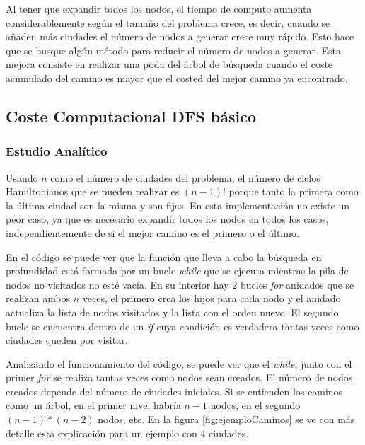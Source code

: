 \documentclass{uc3mpracticas}
\begin{document}
  Al tener que expandir todos los nodos, el tiempo de computo aumenta considerablemente según el tamaño del problema crece, es decir, cuando se añaden más ciudades el número de nodos a generar crece muy rápido. Esto hace que se busque algún método para reducir el número de nodos a generar. Esta mejora consiste en realizar una poda del árbol de búsqueda cuando el coste acumulado del camino es mayor que el costed del mejor camino ya encontrado.



  \subsection{Coste Computacional DFS básico}

  \subsubsection{Estudio Analítico}

  Usando $n$ como el número de ciudades del problema, el número de ciclos Hamiltonianos que se pueden realizar es $(n-1)!$ porque tanto la primera como la última ciudad son la misma y son fijas. En esta implementación no existe un peor caso, ya que es necesario expandir todos los nodos en todos los casos, independientemente de si el mejor camino es el primero o el último.

  \vspace{2mm}

  En el código se puede ver que la función que lleva a cabo la búsqueda en profundidad está formada por un bucle \textit{while} que se ejecuta mientras la pila de nodos no visitados no esté vacía. En su interior hay 2 bucles \textit{for} anidados que se realizan ambos $n$ veces, el primero crea los hijos para cada nodo y el anidado actualiza la lista de nodos visitados y la lista con el orden nuevo. El segundo bucle se encuentra dentro de un \textit{if} cuya condición es verdadera tantas veces como ciudades queden por visitar.

  \vspace{2mm}

  Analizando el funcionamiento del código, se puede ver que el \textit{while}, junto con el primer \textit{for} se realiza tantas veces como nodos sean creados. El número de nodos creados depende del número de ciudades iniciales. Si se entienden los caminos como un árbol, en el primer nivel habría $n-1$ nodos, en el segundo $(n-1)*(n-2)$ nodos, etc. En la figura \ref{fig:ejemploCaminos} se ve con más detalle esta explicación para un ejemplo con 4 ciudades.
  
\end{document}
